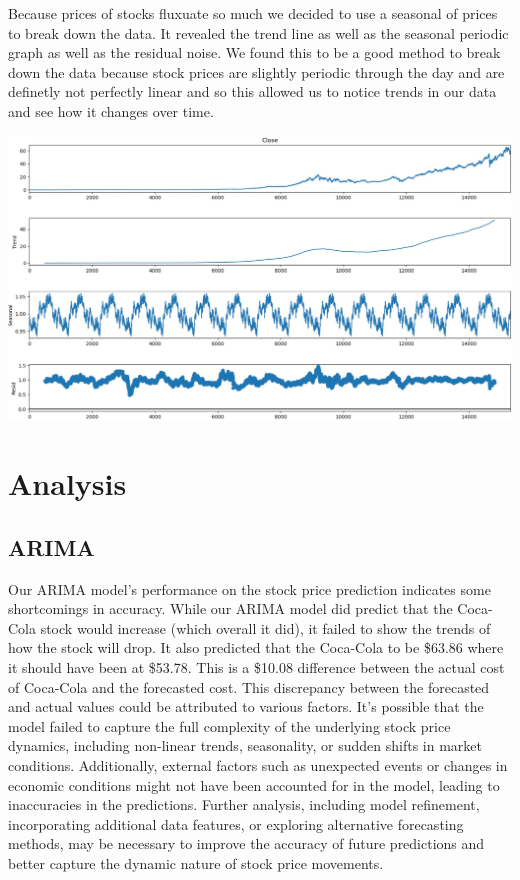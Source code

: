 \documentclass[12pt]{article}
\begin{document}
Because prices of stocks fluxuate so much we decided to use a seasonal of prices to break down the data. It 
revealed the trend line as well as the seasonal periodic graph as well as the residual noise. We found this to 
be a good method to break down the data because stock prices are slightly periodic through the day and are definetly 
not perfectly linear and so this allowed us to notice trends in our data and see how it changes over time.

\includegraphics[width=\textwidth]{../images/decomposition.pdf}

\section{Analysis}

\subsection{ARIMA}
Our ARIMA model's performance on the stock price prediction indicates some shortcomings in accuracy. While our ARIMA 
model did predict that the Coca-Cola stock would increase (which overall it did), it failed to show the trends of how 
the stock will drop. It also predicted that the Coca-Cola to be \$63.86 where it should have been at \$53.78. This is 
a \$10.08 difference between the actual cost of Coca-Cola and the forecasted cost. This discrepancy between the 
forecasted and actual values could be attributed to various factors. It's possible that the model failed to capture 
the full complexity of the underlying stock price dynamics, including non-linear trends, seasonality, or sudden shifts 
in market conditions. Additionally, external factors such as unexpected events or changes in economic conditions might 
not have been accounted for in the model, leading to inaccuracies in the predictions. Further analysis, including model 
refinement, incorporating additional data features, or exploring alternative forecasting methods, may be necessary to 
improve the accuracy of future predictions and better capture the dynamic nature of stock price movements.
\end{document}
